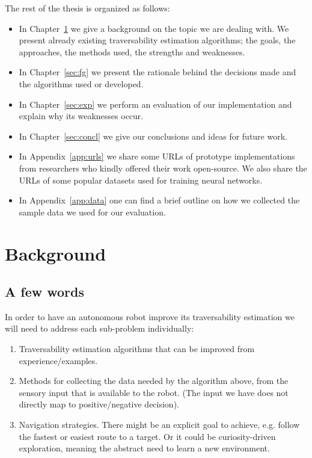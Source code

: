 \documentclass[12pt,a4paper,table,dvipsnames,tikz]{report}
\newcommand{\acronym}{\MakeUppercase}
\begin{document}
	The rest of the thesis is organized as follows:
	\begin{itemize}
		\item In Chapter~\ref{sec:bg} we give a background on the topic we are dealing 
		with. We present already existing traversability estimation algorithms; the 
		goals, the approaches, the methods used, the strengths and weaknesses. 
		\item In Chapter~\ref{sec:fg} we present the rationale behind the decisions made 
		and the algorithms used or developed.
		\item In Chapter~\ref{sec:exp} we perform an evaluation of our implementation 
		and explain why its weaknesses occur.
		\item In Chapter~\ref{sec:concl} we give our conclusions and ideas for future 
		work.
		\item In Appendix~\ref{app:urls} we share some \acronym{url}s of prototype 
		implementations from researchers who kindly offered their work open-source. 
		We also share the \acronym{url}s of some popular datasets used for training
		neural networks.
		\item In Appendix~\ref{app:data} one can find a brief outline on how 
		we collected the sample data we used for our evaluation.
	\end{itemize}
	
	\chapter{Background}
	\label{sec:bg}
	
	\section{A few words}
	\label{sec:bg:intro}
	
	In order to have an autonomous robot improve its traversability 
	estimation we will need to address each sub-problem individually:
	
	\begin{enumerate}
		\item Traversability estimation algorithms that can be improved from 
		experience/examples.
		\item Methods for collecting the data needed by the algorithm above, from 
		the sensory input that is available to the robot. (The input we have does not 
		directly map to positive/negative decision).
		\item Navigation strategies. There might be an explicit goal to achieve, e.g.
		follow the fastest or easiest route to a target. Or it could be curiosity-driven 
		exploration, meaning the abstract need to learn a new environment.
	\end{enumerate}
	
\end{document}
